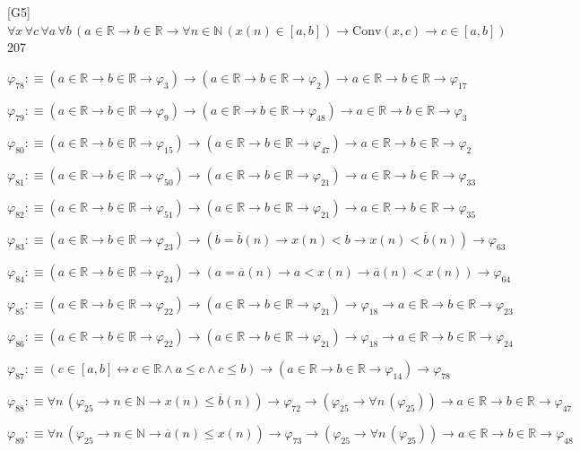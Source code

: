 \begin{fullproof}{[G5]}{$\forall x\,\forall c\,\forall a\,\forall b\,(a \in \mathbb{R} \to b \in \mathbb{R} \to \forall n \in \mathbb{N}\,(x(n) \in [a,b]) \to \mathrm{Conv}(x,c) \to c \in [a,b])$}{207}
\begin{abbrevlist}
\item $\varphi_{78} :\equiv (a \in \mathbb{R} \to b \in \mathbb{R} \to \varphi_{3}) \to (a \in \mathbb{R} \to b \in \mathbb{R} \to \varphi_{2}) \to a \in \mathbb{R} \to b \in \mathbb{R} \to \varphi_{17}$
\item $\varphi_{79} :\equiv (a \in \mathbb{R} \to b \in \mathbb{R} \to \varphi_{9}) \to (a \in \mathbb{R} \to b \in \mathbb{R} \to \varphi_{48}) \to a \in \mathbb{R} \to b \in \mathbb{R} \to \varphi_{3}$
\item $\varphi_{80} :\equiv (a \in \mathbb{R} \to b \in \mathbb{R} \to \varphi_{15}) \to (a \in \mathbb{R} \to b \in \mathbb{R} \to \varphi_{47}) \to a \in \mathbb{R} \to b \in \mathbb{R} \to \varphi_{2}$
\item $\varphi_{81} :\equiv (a \in \mathbb{R} \to b \in \mathbb{R} \to \varphi_{50}) \to (a \in \mathbb{R} \to b \in \mathbb{R} \to \varphi_{21}) \to a \in \mathbb{R} \to b \in \mathbb{R} \to \varphi_{33}$
\item $\varphi_{82} :\equiv (a \in \mathbb{R} \to b \in \mathbb{R} \to \varphi_{51}) \to (a \in \mathbb{R} \to b \in \mathbb{R} \to \varphi_{21}) \to a \in \mathbb{R} \to b \in \mathbb{R} \to \varphi_{35}$
\item $\varphi_{83} :\equiv (a \in \mathbb{R} \to b \in \mathbb{R} \to \varphi_{23}) \to (b = \overline{b}(n) \to x(n) < b \to x(n) < \overline{b}(n)) \to \varphi_{63}$
\item $\varphi_{84} :\equiv (a \in \mathbb{R} \to b \in \mathbb{R} \to \varphi_{24}) \to (a = \overline{a}(n) \to a < x(n) \to \overline{a}(n) < x(n)) \to \varphi_{64}$
\item $\varphi_{85} :\equiv (a \in \mathbb{R} \to b \in \mathbb{R} \to \varphi_{22}) \to (a \in \mathbb{R} \to b \in \mathbb{R} \to \varphi_{21}) \to \varphi_{18} \to a \in \mathbb{R} \to b \in \mathbb{R} \to \varphi_{23}$
\item $\varphi_{86} :\equiv (a \in \mathbb{R} \to b \in \mathbb{R} \to \varphi_{22}) \to (a \in \mathbb{R} \to b \in \mathbb{R} \to \varphi_{21}) \to \varphi_{18} \to a \in \mathbb{R} \to b \in \mathbb{R} \to \varphi_{24}$
\item $\varphi_{87} :\equiv (c \in [a,b] \leftrightarrow c \in \mathbb{R} \land a \leq c \land c \leq b) \to (a \in \mathbb{R} \to b \in \mathbb{R} \to \varphi_{14}) \to \varphi_{78}$
\item $\varphi_{88} :\equiv \forall n\,(\varphi_{25} \to n \in \mathbb{N} \to x(n) \leq \overline{b}(n)) \to \varphi_{72} \to (\varphi_{25} \to \forall n\,(\varphi_{25})) \to a \in \mathbb{R} \to b \in \mathbb{R} \to \varphi_{47}$
\item $\varphi_{89} :\equiv \forall n\,(\varphi_{25} \to n \in \mathbb{N} \to \overline{a}(n) \leq x(n)) \to \varphi_{73} \to (\varphi_{25} \to \forall n\,(\varphi_{25})) \to a \in \mathbb{R} \to b \in \mathbb{R} \to \varphi_{48}$
\end{abbrevlist}
\end{fullproof}
